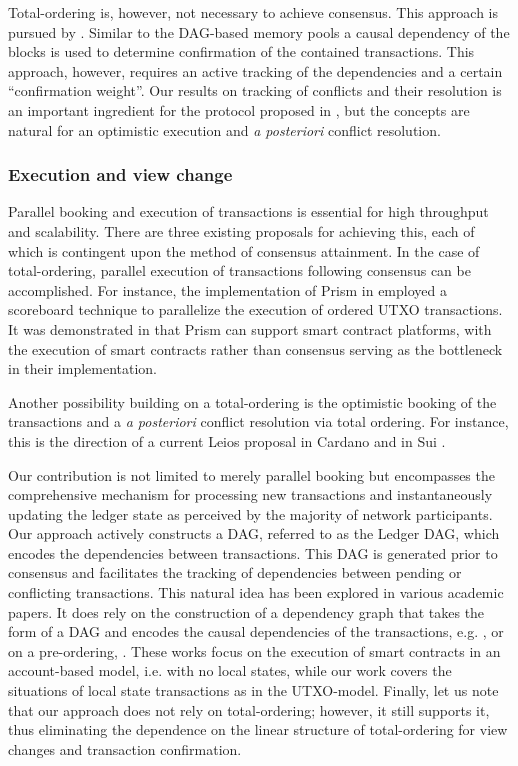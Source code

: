 \documentclass[11pt]{article}
\theoremstyle{plain}
\theoremstyle{definition}
\numberwithin{definition}{section}
\numberwithin{lemma}{section}
\numberwithin{ass}{section}
\numberwithin{remark}{section}
\numberwithin{example}{section}
\numberwithin{proposition}{section}
\numberwithin{theorem}{section}
\begin{document}
Total-ordering is, however, not necessary to achieve consensus. This approach is pursued by \cite{OTV}. Similar to the DAG-based memory pools a causal dependency of the blocks is used to determine confirmation of the contained transactions. This approach, however, requires an active tracking of the dependencies and a certain ``confirmation weight''. Our results on tracking of conflicts and their resolution is an important ingredient for the protocol proposed in \cite{OTV}, but the concepts are natural for an optimistic execution and \textit{a posteriori} conflict resolution.

\subsubsection{Execution and view change} 
Parallel booking and execution of transactions is essential for high throughput and scalability. There are three existing proposals for achieving this, each of which is contingent upon the method of consensus attainment. In the case of total-ordering, parallel execution of transactions following consensus can be accomplished. For instance, the implementation of Prism \cite{Prism} in \cite{Prism10000}  employed a scoreboard technique to parallelize the execution of ordered UTXO transactions. It was demonstrated in \cite{prismSC} that Prism can support smart contract platforms, with the execution of smart contracts rather than consensus serving as the bottleneck in their implementation. 

Another possibility building on a total-ordering is the optimistic booking of the transactions and a \textit{a posteriori} conflict resolution via total ordering. For instance, this is the direction of a current Leios proposal in Cardano \cite{OuroLeios} and in Sui \cite{suiWP}.

{Our contribution is not limited to merely parallel booking but encompasses the comprehensive mechanism for processing new transactions and instantaneously updating the ledger state as perceived by the majority of network participants. Our approach actively constructs a DAG, referred to as the Ledger DAG, which encodes the dependencies between transactions. This DAG is generated prior to consensus and facilitates the tracking of dependencies between pending or conflicting transactions. This natural idea has been explored in various academic papers. It does rely on the construction of a dependency graph that takes the form of a DAG and encodes the causal dependencies of the transactions, e.g. \cite{ConcurrencyToSC, OptSmart}, or on a pre-ordering, \cite{BlockSTM}. These works focus on the execution of smart contracts in an account-based model, i.e. with no local states, while our work covers the situations of local state transactions as in the UTXO-model.
Finally, let us note that our approach does not rely on total-ordering; however, it still supports it, thus eliminating the dependence on the linear structure of total-ordering for view changes and transaction confirmation.}
\end{document}
